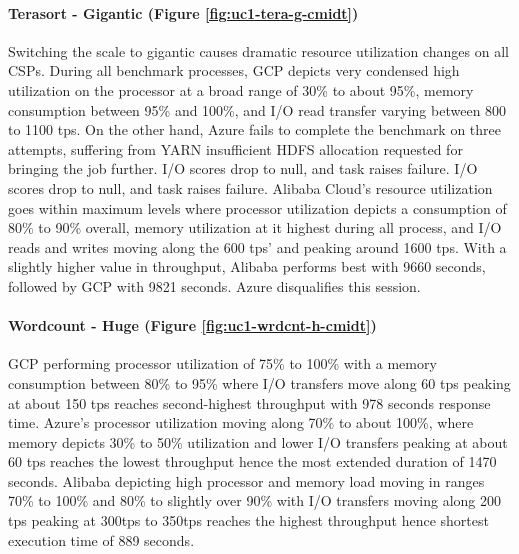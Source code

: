 \documentclass[review]{elsarticle}
\begin{document}
\paragraph{Terasort - Gigantic (Figure \ref{fig:uc1-tera-g-cmidt})}Switching the scale to gigantic causes dramatic resource utilization changes on all CSPs. During all benchmark processes, GCP depicts very condensed high utilization on the processor at a broad range of 30\% to about 95\%, memory consumption between 95\% and 100\%, and I/O read transfer varying between 800 to 1100 tps. On the other hand, Azure fails to complete the benchmark on three attempts, suffering from YARN insufficient HDFS allocation requested for bringing the job further. I/O scores drop to null, and task raises failure. I/O scores drop to null, and task raises failure. Alibaba Cloud's resource utilization goes within maximum levels where processor utilization depicts a consumption of 80\% to 90\% overall, memory utilization at it highest during all process, and I/O reads and writes moving along the 600 tps' and peaking around 1600 tps. With a slightly higher value in throughput, Alibaba performs best with 9660 seconds, followed by GCP with 9821 seconds. Azure disqualifies this session.

\paragraph{Wordcount - Huge (Figure \ref{fig:uc1-wrdcnt-h-cmidt})}GCP performing processor utilization of 75\% to 100\% with a memory consumption between 80\% to 95\% where I/O transfers move along 60 tps peaking at about 150 tps reaches second-highest throughput with 978 seconds response time. Azure's processor utilization moving along 70\% to about 100\%, where memory depicts 30\% to 50\% utilization and lower I/O transfers peaking at about 60 tps reaches the lowest throughput hence the most extended duration of 1470 seconds. Alibaba depicting high processor and memory load moving in ranges 70\% to 100\% and 80\% to slightly over 90\% with I/O transfers moving along 200 tps peaking at 300tps to 350tps reaches the highest throughput hence shortest execution time of 889 seconds.
\end{document}
